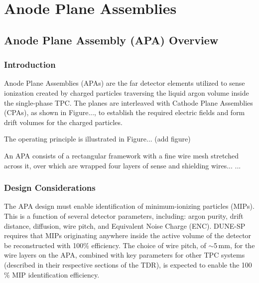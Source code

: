 \chapter{Anode Plane Assemblies}
\label{ch:fdsp-apa}

\section{Anode Plane Assembly (APA) Overview}
\label{sec:fdsp-apa-ov}

\subsection{Introduction}
\label{sec:fdsp-apa-intro}

Anode Plane Assemblies (APAs) are the far detector elements utilized to sense ionization created by
charged particles traversing the liquid argon volume inside the single-phase TPC. The planes are interleaved with Cathode Plane Assemblies (CPAs), as shown in Figure..., to establish the required electric fields and form drift volumes for the charged particles. 


The operating principle is illustrated in Figure... (add figure)

An APA consists of a rectangular framework with a fine wire mesh stretched across it, over which are wrapped four layers of sense and shielding wires...
...

\subsection{Design Considerations}
\label{sec:fdsp-apa-des-consid}


The APA design must enable identification of minimum-ionizing particles (MIPs). This is a function of several detector parameters, including: argon purity, drift distance, diffusion, wire pitch, and Equivalent Noise Charge (ENC).  DUNE-SP requires that MIPs originating anywhere inside the active volume of the detector be reconstructed with 100$\%$ efficiency.   The choice of wire pitch, of $\sim$5\,mm, for the wire layers on the APA, combined with key parameters for other TPC systems (described in their respective sections of the TDR), is expected to enable the 100$\%$ MIP identification efficiency.

